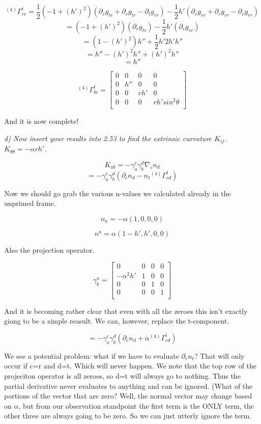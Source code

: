 \documentclass[landscape,letterpaper,10pt,english]{article}
\begin{document}
    \[ {}^{(4)}\Gamma^t_{rr} = \frac12 (-1+(h')^2) (\partial_r g_{tr} + \partial_r g_{tr} - \partial_t g_{rr}) - \frac12 h'(\partial_r g_{rr} + \partial_r g_{rr} - \partial_r g_{rr}) \]
\[  =  (-1+(h')^2) (\partial_r g_{tr}) - \frac12 h'(\partial_r g_{rr}) \]
\[  =  (1-(h')^2) h'' + \frac12 h' 2 h' h'' \]
\[  =  h''-(h')^2h'' + (h')^2 h'' \] \[  = h'' \]

    \[ {}^{(4)}\Gamma^t_{bc} = \begin{bmatrix}
0 & 0 & 0 & 0 \\
0 & h'' & 0 & 0 \\
0 & 0 & rh' & 0 \\
0 & 0 & 0 & rh'sin^2\theta \\
\end{bmatrix}\]

And it is now complete!

    \emph{d) Now insert your results into 2.53 to find the extrinsic
curvature \(K_{ij}\). \(K_{\theta\theta} = -\alpha r h'\).}

    \[ K_{ab} = -\gamma^c_a \gamma^d_b \nabla_c n_d\]
\[ = -\gamma^c_a \gamma^d_b (\partial_c n_d - n_t {}^{(4)}\Gamma^t_{cd})\]

    Now we should go grab the various n-values we calculated already in the
unprimed frame.

\[ n_a = -\alpha(1,0,0,0) \]

\[ n^a = \alpha(1-h', h',0,0) \]

Also the projection operator.

\[ \gamma^a_b = \begin{bmatrix}
0 & 0 & 0 & 0 \\
-\alpha^2h' & 1 & 0 & 0 \\
0 & 0 & 1 & 0 \\
0 & 0 & 0 & 1 \\
\end{bmatrix}\]

    And it is becoming rather clear that even with all the zeroes this isn't
exactly giong to be a simple reasult. We can, however, replace the
t-component.

\[ = -\gamma^c_a \gamma^d_b (\partial_c n_d + \alpha {}^{(4)}\Gamma^t_{cd})\]

    We see a potential problem: what if we have to evaluate
\(\partial_r n_t\)? That will only occur if c=r and d=t. Which will
never happen. We note that the top row of the projeciton operator is all
zeroes, so d=t will always go to nothing. Thus the partial derivative
never evaluates to anything and can be ignored. (What of the portions of
the vector that are zero? Well, the normal vector may change based on
\(\alpha\), but from our observation standpoint the first term is the
ONLY term, the other three are always going to be zero. So we can just
utterly ignore the term.
\end{document}
